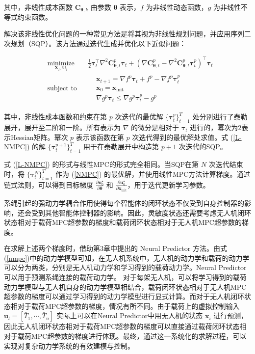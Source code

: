 \documentclass[lang=chs, degree=master, blindreview=true, winfonts=true]{yanputhesis}
\begin{document}
其中，非线性成本函数 \( \bm C_{\bm \theta,k} \) 由参数 \( \bm \theta \) 表示，\( f \) 为非线性动态函数，\( g \) 为非线性不等式约束函数。

解决该非线性优化问题的一种常见方法是将其视为非线性规划问题，并应用序列二次规划（SQP）。该方法通过迭代生成并优化以下近似问题：

\begin{equation}
\begin{aligned} 
&\operatorname*{minimize}_{\bm{X}_l, \bm{U}_l} & & \frac{1}{2}\bm{\tau}_{t}^{\top}\nabla^{2}\bm C_{\bm \theta,t}^{p}\bm{\tau}_{t}+(\nabla \bm C_{\bm \theta,t}^{p}-\nabla^{2}\bm C_{\bm \theta,t}^{p}\bm{\tau}_{t}^{p})^{\top}\bm{\tau}_{t} \\
&\text{subject to} & & \begin{aligned}
& \bm{x}_{t+1}=\nabla f^{p}\bm{\tau}_{t}+f^{p}-\nabla f^{p}\bm{\tau}_{t}^{p} \\
& \bm{x}_{0} = \bm{x}_\text{init} \\
& \nabla g^{p}\bm{\tau}_{t}\leq\nabla g^{p}\bm{\tau}_{t}^{p}-g^{p}	
\end{aligned}
\end{aligned}	
\label{L-NMPC}
\end{equation}

其中，非线性成本函数和约束在第 \(p\) 次迭代的最优解 \( \{\bm  \tau_t^p \}_{t=1}^{T} \) 处分别进行了泰勒展开，展开至二阶和一阶。所有表示为 \( \nabla \) 的微分是相对于 \( \bm \tau_t \) 进行的，幂次为2表示Hessian矩阵。幂次 \( p \) 表示该函数在第 \( p \) 次迭代得到的最优解处求值。式 (\ref{L-NMPC}) 的解 \( \{\bm \tau_t^{p+1} \}_{t=1}^{T} \) 用于在泰勒展开中构造第 \( p+1 \) 次迭代的SQP。

式 (\ref{L-NMPC}) 的形式与线性MPC的形式完全相同。当SQP在第 \( N \) 次迭代结束时，将 \( \{\bm \tau_t^N \}_{t=1}^{T} \) 作为 (\ref{NMPC}) 的最优解，并使用线性MPC方法计算梯度\cite{tao2024difftune}。通过链式法则，可以得到目标梯度 \( \frac{\partial \bm u_0^\star}{\partial \bm \theta} \) 和 \( \frac{\partial \bm u_0^\star}{\partial \bm x_{\text{init}}} \)，用于迭代更新学习参数。





系绳引起的强动力学耦合作用使得每个智能体的闭环状态不仅受到自身控制器的影响，还会受到其他智能体控制器的影响。因此，灵敏度状态还需要考虑无人机闭环状态相对于载荷MPC超参数的梯度和载荷闭环状态相对于无人机MPC超参数的梯度。

在求解上述两个梯度时，借助第3章中提出的 Neural Predictor 方法。由式(\ref{nmpc})中的动力学模型可知，在无人机系统中，无人机的动力学和载荷的动力学可以分为两类，分别是无人机动力学和学习得到的载荷动力学。Neural Predictor可以用于预测系绳连接的载荷动力学。
对于每架无人机，可以将学习得到的载荷动力学模型与无人机自身的动力学模型相结合，载荷闭环状态相对于无人机MPC超参数的梯度可以通过学习得到的动力学模型进行显式计算。而对于无人机闭环状态相对于载荷MPC超参数的梯度，情况有所不同。由于载荷上的虚拟控制输入 \( \bm{u}_l = \left[ \bar{T}_1, \cdots, \bar{T}_n \right] \) 实际上可以在Neural Predictor中用无人机的状态 \( \bm{x}_i \) 进行预测，因此无人机闭环状态相对于载荷MPC超参数的梯度可以直接通过载荷闭环状态相对于载荷MPC超参数的梯度进行体现。最终，通过这一系统化的求解过程，可以实现对复杂动力学系统的有效建模与控制。
\end{document}
